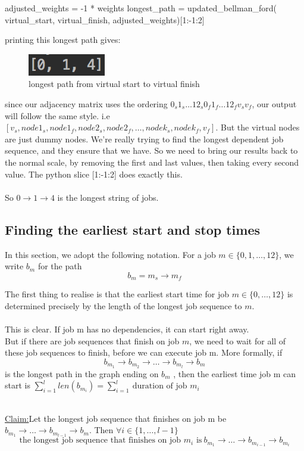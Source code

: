 \documentclass[paper=a4, fontsize=12pt]{scrartcl} %
\newenvironment{claim}[1]{\par\noindent\underline{Claim:}\space#1}{}
\numberwithin{equation}{section}       %
\numberwithin{figure}{section}         %
\numberwithin{table}{section}          %
\begin{document}
\begin{python}
    adjusted_weights = -1 * weights
    longest_path = updated_bellman_ford(
        virtual_start, virtual_finish, adjusted_weights)[1:-1:2]
\end{python}
printing this longest path gives:
\begin{figure}[h]
\caption{longest path from virtual start to virtual finish}
\centering
\includegraphics[scale=0.9]{long}
\end{figure}

\bcattention \quad since our adjacency matrix uses the ordering $0_{s} 1_{s} \dots 12_{s} 0_{f} 1_{f} \dots 12_{f} v_{s} v_{f}$, our output will follow the same style. i.e $[v_{s},node1_{s},node1_{f},node2_{s},node2_{f},\dots,nodek_{s},nodek_{f},v_{f}]$. But the virtual nodes are just dummy nodes. We're really trying to find the longest dependent job sequence, and they ensure that we have. So we need to bring our results back to the normal scale, by removing the first and last values, then taking every second value. The python slice [1:-1:2] does exactly this. \\ \\

So $0 \to 1 \to 4$ is the longest string of jobs.

\subsection{Finding the earliest start and stop times}
In this section, we adopt the following notation. For a job $m \in \{0,1,\dots,12 \}$, we write $b_{m}$ for the path 
$$ b_{m} = m_{s} \to m_{f} $$

The first thing to realise is that the earliest start time for job $m \in \{ 0, \dots, 12 \}$ is determined precisely by the length of the longest job sequence to $m$. \\ \\
This is clear. If job m has no dependencies, it can start right away. \\ 
But if there are job sequences that finish on job $m$, we need to wait for all of these job sequences to finish, before we can execute job m. More formally, if $$ b_{m_{1}} \to b_{m_{2}} \to \dots \to b_{m_{l}} \to b_{m}$$
is the longest path in the graph ending on $b_{m}$ , then the earliest time job m can start is $\sum_{i=1}^{l}len(b_{m_{i}}) = \sum_{i=1}^{l} \ \text{duration of job $m_{i}$}$ \\ \\
\begin{claim}
Let the longest job sequence that finishes on job m be $b_{m_{1}} \to \dots \to b_{m_{l-1}} \to b_{m}$. Then $\forall i \in \{ 1,\dots,l-1\}$ $$\text{the longest job sequence that finishes on job $m_{i}$ is} \ b_{m_{1}} \to \dots \to b_{m_{i-1}} \to b_{m_{i}}$$
\end{claim}
\end{document}
